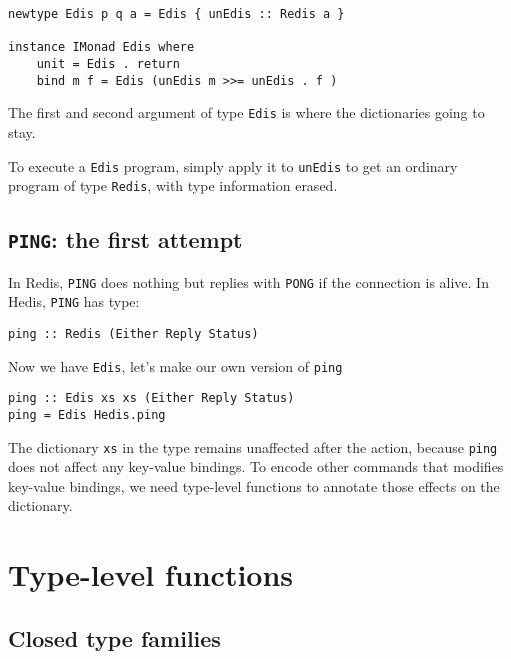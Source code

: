 \documentclass[pldi]{sigplanconf-pldi16}
\begin{document}
\begin{verbatim}
newtype Edis p q a = Edis { unEdis :: Redis a }

instance IMonad Edis where
    unit = Edis . return
    bind m f = Edis (unEdis m >>= unEdis . f )
\end{verbatim}

The first and second argument of type \texttt{Edis} is where the
dictionaries going to stay.

To execute a \texttt{Edis} program, simply apply it to
 \texttt{unEdis} to get an ordinary program of type
 \texttt{Redis}, with type information erased.

\subsection{\texttt{PING}: the first attempt}

In Redis, \texttt{PING} does nothing but replies with
 \texttt{PONG} if the connection is alive. In Hedis,
 \texttt{PING} has type:

\begin{verbatim}
ping :: Redis (Either Reply Status)
\end{verbatim}

Now we have \texttt{Edis}, let's make our own version of
\texttt{ping}\footnotemark


\begin{verbatim}
ping :: Edis xs xs (Either Reply Status)
ping = Edis Hedis.ping
\end{verbatim}

The dictionary \texttt{xs} in the type remains unaffected after the
 action, because \texttt{ping} does not affect any key-value
 bindings. To encode other commands that modifies key-value bindings, we need
 type-level functions to annotate those effects on the dictionary.

\section{Type-level functions}
\subsection{Closed type families}
\end{document}
